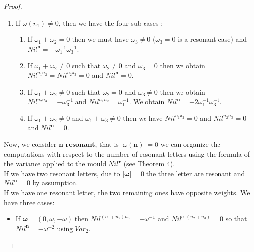\documentclass[english,11pt]{amsart}
\def\nn{\mathbf{n}}
\def\nn{\mathbf{n}}
\def\oo{\boldsymbol\omega}
\def\o{\omega}
\begin{document}
\begin{proof}
\begin{enumerate}
\begin{enumerate}
            \item If $\omega (n_2)\not= 0$ and $\o(n_3)= 0$, then we have $Nil^{n_1n_2}=-\o_2^{-1}$ and $Nil^{n_2n_3}=\o_2^{-1}$. We obtain $Nil^\nn=-2\o_2^{-2}$ because $\o(\nn)=\o_2.$

            \item If $\omega (n_2)\not= 0$ and $\omega (n_3)\not= 0$, then we have $Nil^{n_1n_2}=-\o_2^{-1}$ and $Nil^{n_2n_3}=0$. We obtain $Nil^\nn=-\o_2^{-1}(\o_2+\o_3)^{-1}$. 
        \end{enumerate}
        \item If $\omega (n_1)\neq 0$, then we have the four sub-cases : 
        \begin{enumerate}
            \item If $\o_1+\o_2= 0$  then we must have $\o_3\neq 0$ ($\o_3=0$ is a resonant case) and $ Nil^\nn = -\o_1^{-1}\o_3^{-1}.$

            \item  If $\o_1+\o_2\neq 0$ such that $\o_2 \neq 0$  and $\o_3=0$ then we obtain $Nil^{n_1n_2}=Nil^{n_2n_3}=0$ and $Nil^\nn=0.$

            \item If $\o_1+\o_2\neq 0$ such that $\o_2 = 0$  and $\o_3\neq 0$ then we obtain $Nil^{n_2n_3}=-\o_3^{-1}$ and $Nil^{n_1n_2}=\o_1^{-1}$. We obtain $Nil^\nn=-2\o_1^{-1}\o_3^{-1}.$
            
            \item If $\o_1+\o_2\neq 0$  and $\o_1+\o_3\neq 0$ then we have $Nil^{n_1n_2}=0$ and $Nil^{n_2n_3}=0$ and $Nil^\nn=0.$
        \end{enumerate} 
        
    \end{enumerate}

Now, we consider $\nn$ \textbf{resonant}, that is $\mid \omega (\nn )\mid =0$ we can organize the computations with respect to the number of resonant letters using the formula of the variance applied to the mould $Nil^\bullet$ (see Theorem 4). \\
If we have two resonant letters, due to $\mid \oo \mid =0$ the three letter are resonant and $Nil^{\nn} =0$ by assumption.\\
If we have one resonant letter, the two remaining ones have opposite weights. We have three cases:
\begin{itemize}
    \item If $\oo =(0,\omega ,-\omega )$ then $Nil^{(n_1 +n_2) n_3} =-\omega^{-1}$ and $Nil^{n_1 (n_2+n_3)} = 0$ so that $Nil^{\nn} = -\omega^{-2}$ using $Var_2$. 


\end{itemize}
\end{proof}
\end{document}
